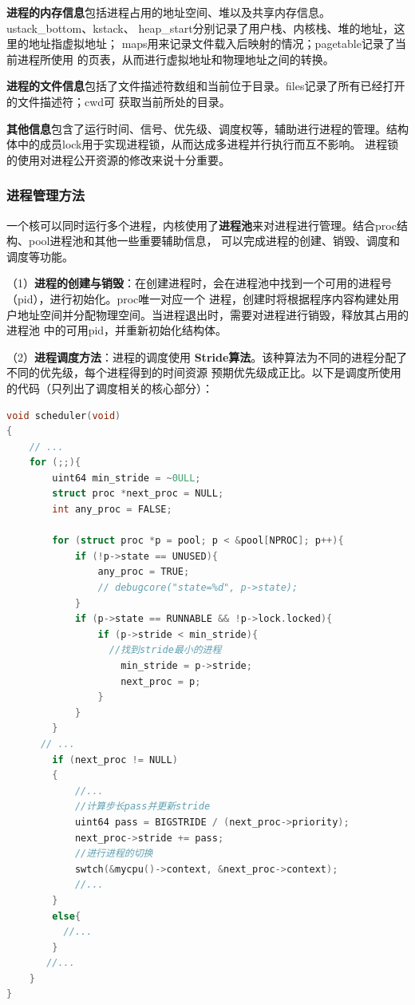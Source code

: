 \documentclass[UTF8,a4paper,10pt]{ctexart}
\begin{document}
\textbf{进程的内存信息}包括进程占用的地址空间、堆以及共享内存信息。ustack\_bottom、kstack、
heap\_start分别记录了用户栈、内核栈、堆的地址，这里的地址指虚拟地址；
maps用来记录文件载入后映射的情况；pagetable记录了当前进程所使用
的页表，从而进行虚拟地址和物理地址之间的转换。

\textbf{进程的文件信息}包括了文件描述符数组和当前位于目录。files记录了所有已经打开的文件描述符；cwd可
获取当前所处的目录。

\textbf{其他信息}包含了运行时间、信号、优先级、调度权等，辅助进行进程的管理。结构体中的成员lock用于实现进程锁，从而达成多进程并行执行而互不影响。
进程锁的使用对进程公开资源的修改来说十分重要。

\subsubsection{进程管理方法}

一个核可以同时运行多个进程，内核使用了\textbf{进程池}来对进程进行管理。结合proc结构、pool进程池和其他一些重要辅助信息，
可以完成进程的创建、销毁、调度和调度等功能。

（1）\textbf{进程的创建与销毁}：在创建进程时，会在进程池中找到一个可用的进程号（pid），进行初始化。proc唯一对应一个
进程，创建时将根据程序内容构建处用户地址空间并分配物理空间。当进程退出时，需要对进程进行销毁，释放其占用的进程池
中的可用pid，并重新初始化结构体。

（2）\textbf{进程调度方法}：进程的调度使用 \textbf{Stride算法}。该种算法为不同的进程分配了不同的优先级，每个进程得到的时间资源
预期优先级成正比。以下是调度所使用的代码（只列出了调度相关的核心部分）：

\begin{lstlisting}[title=进程调度方法,frame=trbl,language={C}]
void scheduler(void)
{
    // ...
    for (;;){
        uint64 min_stride = ~0ULL;
        struct proc *next_proc = NULL;
        int any_proc = FALSE;

        for (struct proc *p = pool; p < &pool[NPROC]; p++){
            if (!p->state == UNUSED){
                any_proc = TRUE;
                // debugcore("state=%d", p->state);
            }
            if (p->state == RUNNABLE && !p->lock.locked){
                if (p->stride < min_stride){
                  //找到stride最小的进程
                    min_stride = p->stride;
                    next_proc = p;
                }
            }
        }
      // ...
        if (next_proc != NULL)
        {
            //...
            //计算步长pass并更新stride
            uint64 pass = BIGSTRIDE / (next_proc->priority);
            next_proc->stride += pass;
            //进行进程的切换
            swtch(&mycpu()->context, &next_proc->context);
            //...
        }
        else{
          //...
        }
       //...
    }
}
  \end{lstlisting}
\end{document}

